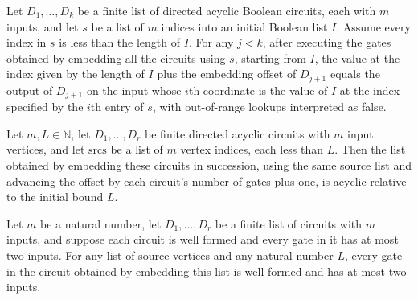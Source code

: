 \begin{theorem}
\label{BoolCircuit.runWith_embedAll_getD}
\leanok
{}
Let $D_1,\ldots,D_k$ be a finite list of directed acyclic Boolean circuits, each with $m$
inputs, and let $s$ be a list of $m$ indices into an initial Boolean list $I$. Assume
every index in $s$ is less than the length of $I$. For any $j<k$, after executing the
gates obtained by embedding all the circuits using $s$, starting from $I$, the value at
the index given by the length of $I$ plus the embedding offset of $D_{j+1}$ equals the
output of $D_{j+1}$ on the input whose $i$th coordinate is the value of $I$ at the index
specified by the $i$th entry of $s$, with out-of-range lookups interpreted as false.
\end{theorem}

\begin{theorem}
\label{BoolCircuit.gatesAcyclic_embedAll}
\leanok
{}
Let $m,L\in\mathbb{N}$, let $D_1,\ldots,D_r$ be finite directed acyclic circuits with
$m$ input vertices, and let $\mathrm{srcs}$ be a list of $m$ vertex indices, each less
than $L$. Then the list obtained by embedding these circuits in succession, using the
same source list and advancing the offset by each circuit's number of gates plus one, is
acyclic relative to the initial bound $L$.
\end{theorem}

\begin{theorem}
\label{BoolCircuit.faninTwo_embedAll}
\leanok
{}
Let $m$ be a natural number, let $D_1,\ldots,D_r$ be a finite list of circuits with $m$
inputs, and suppose each circuit is well formed and every gate in it has at most two
inputs. For any list of source vertices and any natural number $L$, every gate in the
circuit obtained by embedding this list is well formed and has at most two inputs.
\end{theorem}
